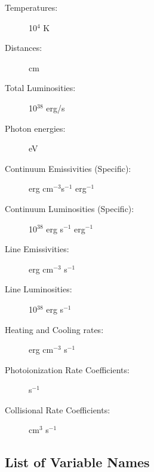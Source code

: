 \begin{description}
\item[Temperatures:] 10$^4$ K
\item[Distances:] cm
\item[Total Luminosities:] 10$^{38}$ erg/s
\item[Photon energies:] eV
\item[Continuum Emissivities (Specific):] erg cm$^{-3}$s$^{-1}$ erg$^{-1}$
\item[Continuum Luminosities (Specific):] 10$^{38}$ erg s$^{-1}$ erg$^{-1}$
\item[Line Emissivities:] erg cm$^{-3}$ s$^{-1}$
\item[Line Luminosities:] 10$^{38}$ erg s$^{-1}$
\item[Heating and Cooling rates:] erg cm$^{-3}$ s$^{-1}$
\item[Photoionization Rate Coefficients:] s$^{-1}$
\item[Collisional Rate Coefficients:] cm$^3$ s$^{-1}$
\end{description}

\subsection {List of Variable Names}

